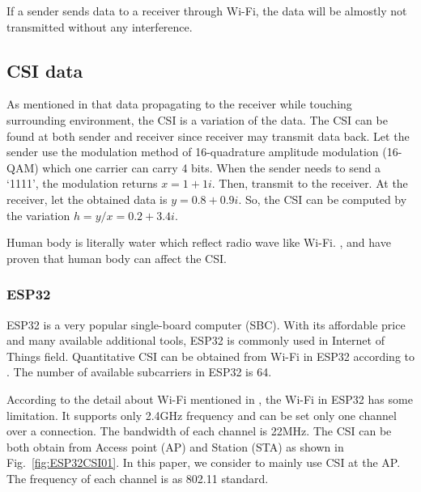 \documentclass[10pt,letterpaper]{article}
\begin{document}
	If a sender sends data to a receiver through Wi-Fi, the data will be almostly not transmitted without any interference.
	
	
	
	\subsection*{CSI data}\label{CSI}
	As mentioned in  that data propagating to the receiver while touching surrounding environment, the CSI is a variation of the data. The CSI can  be found at both sender and receiver since receiver may transmit data back. Let the sender use the modulation method of 16-quadrature amplitude modulation (16-QAM) which one carrier can carry 4 bits. When the sender needs to send a `1111', the modulation returns $x=1+1i$. Then, transmit to the receiver. At the receiver, let the obtained data is $y=0.8+0.9i$. So, the CSI can be computed by the variation $h=y/x=0.2+3.4i$.
	
	Human body is literally water which reflect radio wave like Wi-Fi. \cite{wangF}, \cite{liuJ} and \cite{chowdhuryTZ} have proven that human body can affect the CSI.
	
	\subsubsection*{ESP32}\label{ESP32}
	ESP32 is a very popular single-board computer (SBC). With its affordable price and many available additional tools, ESP32 is commonly used in Internet of Things field.  Quantitative CSI can be obtained from Wi-Fi in ESP32 according to \cite{atifM}. The number of available subcarriers in ESP32 is 64.
	
	According to the detail about Wi-Fi mentioned in , the Wi-Fi in ESP32 has some limitation. It supports only 2.4GHz frequency and can be set only one channel over a connection. The bandwidth of each channel is 22MHz. The CSI can be both obtain from Access point (AP) and Station (STA) as shown in Fig.~\ref{fig:ESP32CSI01}.  In this paper, we consider to mainly use CSI at the AP.
	The frequency of each channel is as 802.11 standard.
	
	
	
\end{document}
